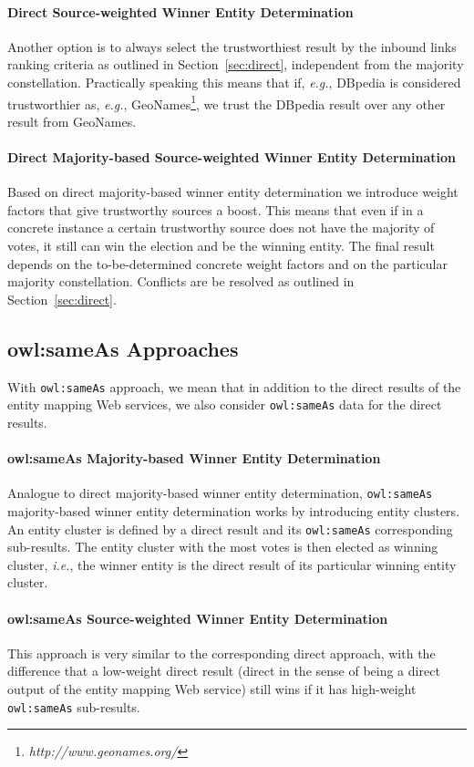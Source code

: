 \paragraph{Direct Source-weighted Winner Entity Determination}
Another option is to always select the trustworthiest result by the inbound links ranking criteria as outlined in Section~\ref{sec:direct}, independent from the majority constellation. Practically speaking this means that
if, \emph{e.g.}, DBpedia is considered trustworthier as, \emph{e.g.},  GeoNames\footnote{\textit{http://www.geonames.org/}}, we
trust the DBpedia result over any other result from GeoNames.

\paragraph{Direct Majority-based Source-weighted Winner Entity Determination}
Based on direct majority-based winner entity determination we introduce weight factors that give trustworthy
sources a boost. This means that even if in a concrete instance a certain trustworthy source does not have the majority of votes, it still
can win the election and be the winning entity. The final result depends on the to-be-determined concrete
weight factors and on the particular majority constellation. Conflicts are be resolved as outlined in Section~\ref{sec:direct}.

\subsection{owl:sameAs Approaches}
With \texttt{owl:sameAs} approach, we mean that in addition to the direct results of the entity mapping Web services, we also
consider \texttt{owl:sameAs} data for the direct results.

\paragraph{owl:sameAs Majority-based Winner Entity Determination}\label{sec:owlsameas}
Analogue to direct majority-based winner entity determination, \texttt{owl:sameAs} majority-based winner entity
determination works by introducing entity clusters. An entity cluster is defined by a direct result and its
\texttt{owl:sameAs} corresponding sub-results. The entity cluster with the most votes is then elected as winning
cluster, \emph{i.e.}, the winner entity is the direct result of its particular winning entity cluster.

\paragraph{owl:sameAs Source-weighted Winner Entity Determination}
This approach is very similar to the corresponding direct approach, with the difference that a low-weight direct result
(direct in the sense of being a direct output of the entity mapping Web service) still wins if it has high-weight
\texttt{owl:sameAs} sub-results.

